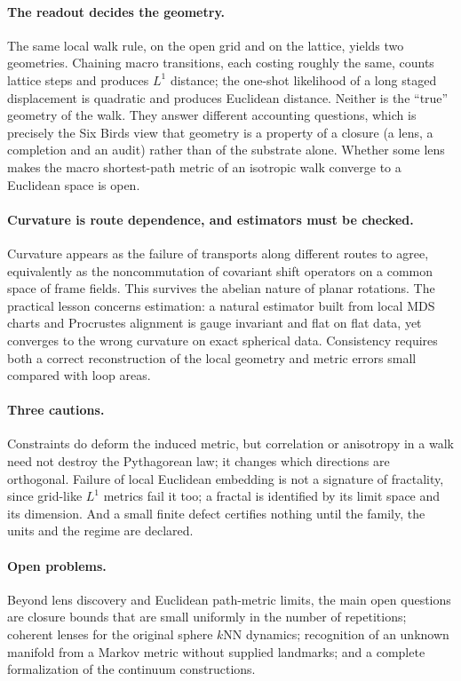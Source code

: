 \paragraph{The readout decides the geometry.}
The same local walk rule, on the open grid and on the lattice, yields two geometries.
Chaining macro transitions, each costing roughly the same, counts lattice steps and produces $L^1$ distance; the one-shot likelihood of a long staged displacement is quadratic and produces Euclidean distance.
Neither is the ``true'' geometry of the walk.
They answer different accounting questions, which is precisely the Six Birds view that geometry is a property of a closure (a lens, a completion and an audit) rather than of the substrate alone.
Whether some lens makes the macro shortest-path metric of an isotropic walk converge to a Euclidean space is open.

\paragraph{Curvature is route dependence, and estimators must be checked.}
Curvature appears as the failure of transports along different routes to agree, equivalently as the noncommutation of covariant shift operators on a common space of frame fields.
This survives the abelian nature of planar rotations.
The practical lesson concerns estimation: a natural estimator built from local MDS charts and Procrustes alignment is gauge invariant and flat on flat data, yet converges to the wrong curvature on exact spherical data.
Consistency requires both a correct reconstruction of the local geometry and metric errors small compared with loop areas.

\paragraph{Three cautions.}
Constraints do deform the induced metric, but correlation or anisotropy in a walk need not destroy the Pythagorean law; it changes which directions are orthogonal.
Failure of local Euclidean embedding is not a signature of fractality, since grid-like $L^1$ metrics fail it too; a fractal is identified by its limit space and its dimension.
And a small finite defect certifies nothing until the family, the units and the regime are declared.

\paragraph{Open problems.}
Beyond lens discovery and Euclidean path-metric limits, the main open questions are closure bounds that are small uniformly in the number of repetitions; coherent lenses for the original sphere $k$NN dynamics; recognition of an unknown manifold from a Markov metric without supplied landmarks; and a complete formalization of the continuum constructions.


